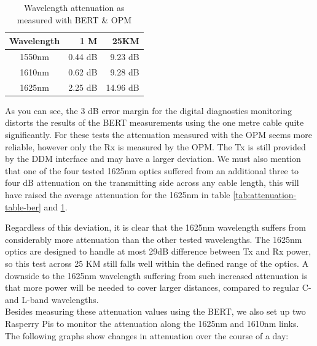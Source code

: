 \documentclass{article}
\begin{document}
\begin{table}[h]
\centering
\label{tab:attenuation-table-ofr}
\begin{tabular}{|c|r|r|}
\hline 
\textbf{Wavelength} & \textbf{1 M} & \textbf{25KM}\\ 
\hline 
1550nm & 0.44 dB & 9.23 dB\\ 
\hline 
1610nm & 0.62 dB & 9.28 dB\\ 
\hline 
1625nm & 2.25 dB & 14.96 dB\\
\hline
\end{tabular}
\caption{Wavelength attenuation as measured with BERT \& OPM}
\end{table}

As you can see, the 3 dB error margin for the digital diagnostics monitoring distorts the results of the BERT measurements using the one metre cable quite significantly.
For these tests the attenuation measured with the OPM seems more reliable, however only the Rx is measured by the OPM.
The Tx is still provided by the DDM interface and may have a larger deviation.
We must also mention that one of the four tested 1625nm optics suffered from an additional three to four dB attenuation on the transmitting side across any cable length, this will have raised the average attenuation for the 1625nm in table \ref{tab:attenuation-table-ber} and \ref{tab:attenuation-table-ofr}.

Regardless of this deviation, it is clear that the 1625nm wavelength suffers from considerably more attenuation than the other tested wavelengths.
The 1625nm optics are designed to handle at most 29dB difference between Tx and Rx power, so this test across 25 KM still falls well within the defined range of the optics.
A downside to the 1625nm wavelength suffering from such increased attenuation is that more power will be needed to cover larger distances, compared to regular C- and L-band wavelengths. \\

Besides measuring these attenuation values using the BERT, we also set up two Rasperry Pis to monitor the attenuation along the 1625nm and 1610nm links.
The following graphs show changes in attenuation over the course of a day:\\
\end{document}
